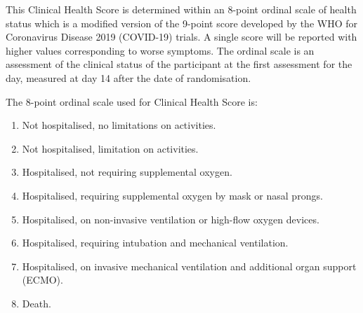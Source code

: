 \documentclass[11pt,parskip=half-]{scrartcl}
\begin{document}
This Clinical Health Score is determined within an 8-point ordinal scale of health status which is a modified version of the 9-point score developed by the WHO for Coronavirus Disease 2019 (COVID-19) trials. A single score will be reported with higher values corresponding to worse symptoms. The ordinal scale is an assessment of the clinical status of the participant at the first assessment for the day, measured at day 14 after the date of randomisation.

The 8-point ordinal scale used for Clinical Health Score is:
\begin{enumerate}[nolistsep]
    \item Not hospitalised, no limitations on activities.
    \item Not hospitalised, limitation on activities.
    \item Hospitalised, not requiring supplemental oxygen.
    \item Hospitalised, requiring supplemental oxygen by mask or nasal prongs.
    \item  Hospitalised, on non-invasive ventilation or high-flow oxygen devices.
    \item Hospitalised, requiring intubation and mechanical ventilation.
    \item Hospitalised, on invasive mechanical ventilation and additional organ support (ECMO).
    \item Death.
\end{enumerate}
\end{document}
